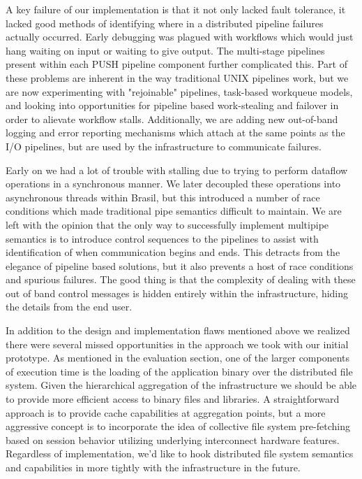 A key failure of our implementation is that it not only lacked
fault tolerance, it lacked good methods of identifying where
in a distributed pipeline failures actually occurred.  Early
debugging was plagued with workflows which would just hang
waiting on input or waiting to give output.  The multi-stage
pipelines present within each PUSH pipeline component further
complicated this.  Part of these problems are inherent in the
way traditional UNIX pipelines work, but we are now experimenting
with "rejoinable" pipelines, task-based workqueue models, and
looking into opportunities for pipeline based work-stealing and
failover in order to alievate workflow stalls.  Additionally,
we are adding new out-of-band logging and error reporting
mechanisms which attach at the same points as the I/O pipelines,
but are used by the infrastructure to communicate failures.

Early on we had a lot of trouble with stalling due to trying to
perform dataflow operations in a synchronous manner.  We later
decoupled these operations into asynchronous threads within
Brasil, but this introduced a number of race conditions which
made traditional pipe semantics difficult to maintain.  We are
left with the opinion that the only way to successfully implement
multipipe semantics is to introduce control sequences to the 
pipelines to assist with identification of when communication
begins and ends.  This detracts from the elegance of pipeline
based solutions, but it also prevents a host of race conditions
and spurious failures.  The good thing is that the complexity 
of dealing with these out of band control messages is hidden 
entirely within the infrastructure, hiding the details from
the end user.

In addition to the design and implementation flaws mentioned
above we realized there were several missed opportunities in
the approach we took with our initial prototype.  
As mentioned in the evaluation section, one of the larger
components of execution time is the loading of the application
binary over the distributed file system.  Given the hierarchical
aggregation of the infrastructure we should be able to provide
more efficient access to binary files and libraries.  A 
straightforward approach is to provide cache capabilities at
aggregation points, but a more aggressive concept is to
incorporate the idea of collective file system pre-fetching
based on session behavior utilizing underlying interconnect
hardware features.  Regardless of implementation, we'd like
to hook distributed file system semantics and capabilities
in more tightly with the infrastructure in the future.

